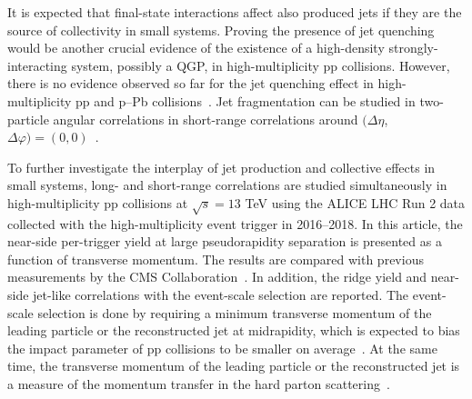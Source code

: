It is expected that final-state interactions affect also produced jets if they are the source of collectivity in small systems. Proving the presence of jet quenching~\cite{Gyulassy:1990ye,Wang:1991xy} would be another crucial evidence of the existence of a high-density strongly-interacting system, possibly a QGP, in high-multiplicity pp collisions. However, there is no evidence observed so far for the jet quenching effect in high-multiplicity pp and p--Pb collisions~\cite{Khachatryan:2016odn,Adam:2016jfp,Adam:2016dau,Acharya:2017okq}. Jet fragmentation can be studied in two-particle angular correlations in short-range correlations around $(\Delta\eta$, $\Delta\varphi)=(0,0)$~\cite{Adam:2016tsv}.  



% 

To further investigate the interplay of jet production and collective effects in small systems, long- and short-range correlations are studied simultaneously in high-multiplicity pp collisions at $\sqrt{s} =13$ TeV using the ALICE LHC Run 2 data collected with the high-multiplicity event trigger in 2016--2018. In this article, the near-side per-trigger yield at large pseudorapidity separation is presented as a function of transverse momentum. The results are compared with previous measurements by the CMS Collaboration~\cite{Khachatryan:2015lva}. %
In addition, the ridge yield and near-side jet-like correlations with the event-scale selection are reported. The event-scale selection is done by requiring a minimum transverse momentum of the leading particle or the reconstructed jet at midrapidity, which is expected to bias the impact parameter of pp collisions to be smaller on average~\cite{Sjostrand:1986ep,Frankfurt:2010ea}. At the same time, the transverse momentum of the leading particle or the reconstructed jet is a measure of the momentum transfer in the hard parton scattering~\cite{Chatrchyan:2012tt,Chatrchyan:2011id}.

